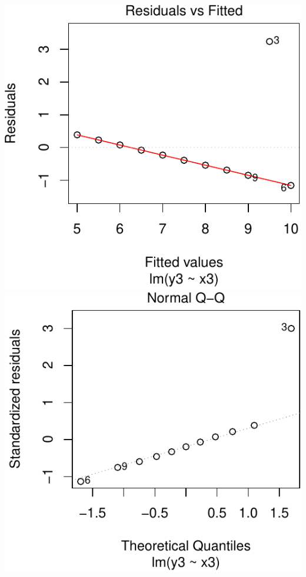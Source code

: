 \documentclass[]{extarticle}
\begin{document}
\includegraphics{20190417_residual_diagnostics_files/figure-latex/unnamed-chunk-15-1.pdf}
\includegraphics{20190417_residual_diagnostics_files/figure-latex/unnamed-chunk-15-2.pdf}
\end{document}
